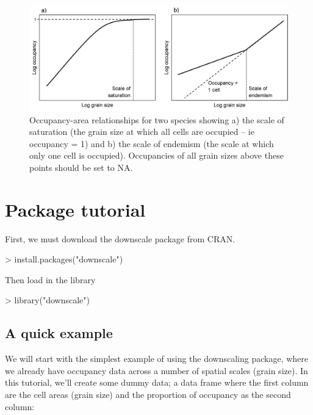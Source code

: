 \documentclass{article}[12pt, a4paper]
\begin{document}
\begin{figure}[!t]
\centering
\includegraphics[width=\linewidth]{Saturation.png}
\caption{Occupancy-area relationships for two species showing a) the scale of saturation (the grain size at which all cells are occupied – ie occupancy = 1) and b) the scale of endemism (the scale at which only one cell is occupied). Occupancies of all grain sizes above these points should be set to NA.}
\label{fig:Saturation}
\end{figure}

\section{Package tutorial}

First, we must download the downscale package from CRAN.

\begin{Schunk}
\begin{Sinput}
> install.packages("downscale")
\end{Sinput}
\end{Schunk}

Then load in the library

\begin{Schunk}
\begin{Sinput}
> library("downscale")
\end{Sinput}
\end{Schunk}

\subsection{A quick example}
We will start with the simplest example of using the downscaling package, where we already have occupancy data across a number of spatial scales (grain size). In this tutorial, we’ll create some dummy data; a data frame where the first column are the cell areas (grain size) and the proportion of occupancy as the second column:
\end{document}
